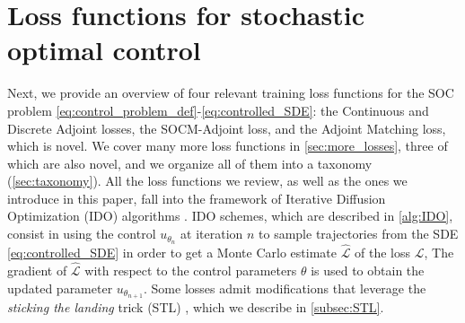 \documentclass[]{fairmeta}
\begin{document}
\section{Loss functions for stochastic optimal control} \label{subsec:existing_losses}

Next, we provide an overview of four relevant training loss functions for the SOC
problem \eqref{eq:control_problem_def}-\eqref{eq:controlled_SDE}: the Continuous and Discrete Adjoint losses, the SOCM-Adjoint loss, and the Adjoint Matching loss, which is novel. 
We cover many more loss functions in \autoref{sec:more_losses}, three of which are also novel, and we organize all of them into a taxonomy (\autoref{sec:taxonomy}). 
All the loss functions we review, as well as the ones we introduce in this paper, fall into the framework of Iterative Diffusion Optimization (IDO) algorithms \citep{nüsken2023solving}. IDO schemes, which are described in \autoref{alg:IDO}, consist in using the control $u_{\theta_n}$ at iteration $n$ to sample trajectories from the SDE \eqref{eq:controlled_SDE} in order to get a Monte Carlo estimate $\hat{\mathcal{L}}$ of the loss $\mathcal{L}$, 
The gradient of $\hat{\mathcal{L}}$ with respect to the control parameters $\theta$ is used to obtain the updated parameter $u_{\theta_{n+1}}$. 
Some losses admit modifications that leverage the \textit{sticking the landing} trick (STL) \citep{roeder2017sticking}, which we describe in \autoref{subsec:STL}.
\end{document}
